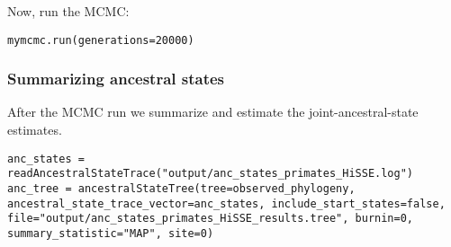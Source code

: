 Now, run the MCMC:
{\tt \begin{snugshade*}
\begin{lstlisting}
mymcmc.run(generations=20000)
\end{lstlisting}
\end{snugshade*}}


\subsubsection{Summarizing ancestral states}
After the MCMC run we summarize and estimate the joint-ancestral-state estimates.
{\tt \begin{snugshade*}
\begin{lstlisting}
anc_states = readAncestralStateTrace("output/anc_states_primates_HiSSE.log")
anc_tree = ancestralStateTree(tree=observed_phylogeny, ancestral_state_trace_vector=anc_states, include_start_states=false, file="output/anc_states_primates_HiSSE_results.tree", burnin=0, summary_statistic="MAP", site=0)
\end{lstlisting}
\end{snugshade*}}



